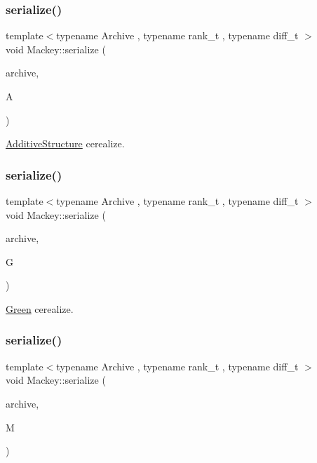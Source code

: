 \subsubsection{\texorpdfstring{serialize()}{serialize()}\hspace{0.1cm}{\footnotesize\ttfamily [5/7]}}
{\footnotesize\ttfamily template$<$typename Archive , typename rank\+\_\+t , typename diff\+\_\+t $>$ \\
void Mackey\+::serialize (\begin{DoxyParamCaption}\item[{Archive \&}]{archive,  }\item[{\hyperlink{classMackey_1_1AdditiveStructure}{Additive\+Structure}$<$ rank\+\_\+t, diff\+\_\+t $>$ \&}]{A }\end{DoxyParamCaption})}



\hyperlink{classMackey_1_1AdditiveStructure}{Additive\+Structure} cerealize. 

\mbox{\label{namespaceMackey_ae6ccf7fecc4fc52a3c7b31876106ae2c}} 
\subsubsection{\texorpdfstring{serialize()}{serialize()}\hspace{0.1cm}{\footnotesize\ttfamily [6/7]}}
{\footnotesize\ttfamily template$<$typename Archive , typename rank\+\_\+t , typename diff\+\_\+t $>$ \\
void Mackey\+::serialize (\begin{DoxyParamCaption}\item[{Archive \&}]{archive,  }\item[{\hyperlink{classMackey_1_1Green}{Green}$<$ rank\+\_\+t, diff\+\_\+t $>$ \&}]{G }\end{DoxyParamCaption})}



\hyperlink{classMackey_1_1Green}{Green} cerealize. 

\mbox{\label{namespaceMackey_ae5d73f6ab42eb8fe9ae441e3ffc4b3a5}} 
\subsubsection{\texorpdfstring{serialize()}{serialize()}\hspace{0.1cm}{\footnotesize\ttfamily [7/7]}}
{\footnotesize\ttfamily template$<$typename Archive , typename rank\+\_\+t , typename diff\+\_\+t $>$ \\
void Mackey\+::serialize (\begin{DoxyParamCaption}\item[{Archive \&}]{archive,  }\item[{\hyperlink{classMackey_1_1MultiplicationTable}{Multiplication\+Table}$<$ rank\+\_\+t, diff\+\_\+t $>$ \&}]{M }\end{DoxyParamCaption})}



